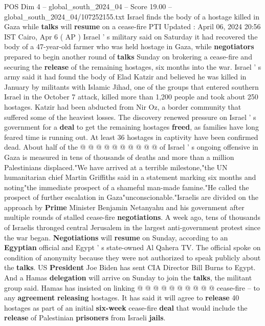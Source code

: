 \begin{textsample}{POS Dim 4 – global\_south\_2024\_04 – Score 19.00 – global\_south\_2024\_04/107252155.txt}  \label{ex:f4_pos_270}
Israel finds the body of a hostage killed in Gaza while \textbf{talks} will \textbf{resume} on a cease-fire PTI Updated : April 06, 2024 20:56 IST Cairo, Apr 6 ( AP ) Israel ' s military said on Saturday it had recovered the body of a 47-year-old farmer who was held hostage in Gaza, while \textbf{negotiators} prepared to begin another round of \textbf{talks} Sunday on brokering a cease-fire and securing the \textbf{release} of the remaining hostages, six months into the war.
Israel ' s army said it had found the body of Elad Katzir and believed he was killed in January by militants with Islamic Jihad, one of the groups that entered southern Israel in the October 7 attack, killed more than 1,200 people and took about 250 hostages.
Katzir had been abducted from Nir Oz, a border community that suffered some of the heaviest losses.
The discovery renewed pressure on Israel ' s government for a \textbf{deal} to get the remaining hostages \textbf{freed}, as families have long feared time is running out.
At least 36 hostages in captivity have been confirmed dead.
About half of the @ @ @ @ @ @ @ @ @ @ of Israel ' s ongoing offensive in Gaza is measured in tens of thousands of deaths and more than a million Palestinians displaced."We have arrived at a terrible milestone,"the UN humanitarian chief Martin Griffiths said in a statement marking six months and noting"the immediate prospect of a shameful man-made famine."He called the prospect of further escalation in Gaza"unconscionable."Israelis are divided on the approach by \textbf{Prime} Minister Benjamin Netanyahu and his government after multiple rounds of stalled cease-fire \textbf{negotiations}.
A week ago, tens of thousands of Israelis thronged central Jerusalem in the largest anti-government protest since the war began. \textbf{Negotiations} will \textbf{resume} on Sunday, according to an \textbf{Egyptian} official and Egypt ' s state-owned Al Qahera TV.
The official spoke on condition of anonymity because they were not authorized to speak publicly about the \textbf{talks}.
US \textbf{President} Joe Biden has sent CIA Director Bill Burns to Egypt.
And a Hamas \textbf{delegation} will arrive on Sunday to join the \textbf{talks}, the militant group said.
Hamas has insisted on linking @ @ @ @ @ @ @ @ @ @ cease-fire -- to any \textbf{agreement} \textbf{releasing} hostages.
It has said it will agree to \textbf{release} 40 hostages as part of an initial \textbf{six-week} cease-fire \textbf{deal} that would include the \textbf{release} of Palestinian \textbf{prisoners} from Israeli \textbf{jails}.

\end{textsample}
